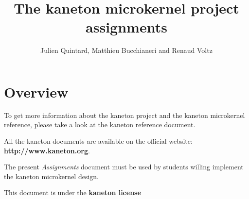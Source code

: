
%
%



%
%


%
%

\title{The kaneton microkernel project assignments
       \logos}

%
%

\author{\small{Julien Quintard},
        \small{Matthieu Bucchianeri} and
        \small{Renaud Voltz}}

%
%

\newcommand\prototype[1]{\hspace{1.5cm}#1}

%
%



%
%

\maketitle

\newpage

\tableofcontents

\newpage

%
%

%
%

\section{Overview}

To get more information about the kaneton project and the kaneton
microkernel reference, please take a look at the kaneton reference
document.

All the kaneton documents are available on the official website:
\textbf{http://www.kaneton.org}.

The present \textit{Assignments} document must be used by students
willing implement the kaneton microkernel design.

This document is under the \textbf{kaneton license}





%

%



